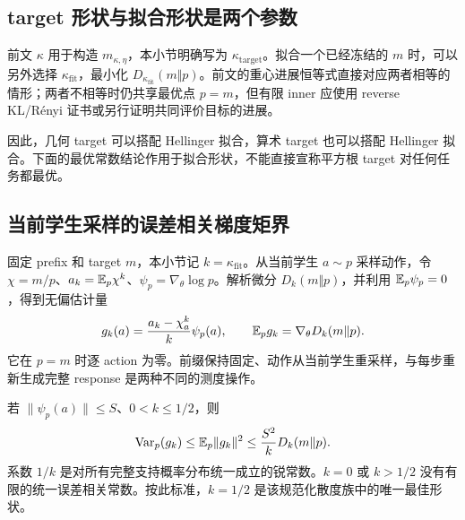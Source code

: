 \subsection{target 形状与拟合形状是两个参数}

前文 $\kappa$ 用于构造 $m_{\kappa,\eta}$，本小节明确写为 $\kappa_{\mathrm{target}}$。拟合一个已经冻结的 $m$ 时，可以另外选择 $\kappa_{\mathrm{fit}}$，最小化 $D_{\kappa_{\mathrm{fit}}}(m\Vert p)$。前文的重心进展恒等式直接对应两者相等的情形；两者不相等时仍共享最优点 $p=m$，但有限 inner 应使用 reverse KL/Rényi 证书或另行证明共同评价目标的进展。

因此，几何 target 可以搭配 Hellinger 拟合，算术 target 也可以搭配 Hellinger 拟合。下面的最优常数结论作用于拟合形状，不能直接宣称平方根 target 对任何任务都最优。

\subsection{当前学生采样的误差相关梯度矩界}

固定 prefix 和 target $m$，本小节记 $k=\kappa_{\mathrm{fit}}$。从当前学生 $a\sim p$ 采样动作，令 $\chi=m/p$、$a_k=\mathbb E_p\chi^k$、$\psi_p=\nabla_\theta\log p$。解析微分 $D_k(m\Vert p)$，并利用 $\mathbb E_p\psi_p=0$，得到无偏估计量
\begin{equation}
 g_k(a)=\frac{a_k-\chi_a^k}{k}\psi_p(a),\qquad
 \mathbb E_pg_k=\nabla_\theta D_k(m\Vert p).
\end{equation}
它在 $p=m$ 时逐 action 为零。前缀保持固定、动作从当前学生重采样，与每步重新生成完整 response 是两种不同的测度操作。

\begin{theorem}[误差相关二阶矩的锐常数]
\label{thm:proximal-sharp-self-bound}
若 $\|\psi_p(a)\|\le S$、$0<k\le1/2$，则
\begin{equation}
 \operatorname{Var}_p(g_k)\le\mathbb E_p\|g_k\|^2
 \le\frac{S^2}{k}D_k(m\Vert p).
\end{equation}
系数 $1/k$ 是对所有完整支持概率分布统一成立的锐常数。$k=0$ 或 $k>1/2$ 没有有限的统一误差相关常数。按此标准，$k=1/2$ 是该规范化散度族中的唯一最佳形状。
\end{theorem}

